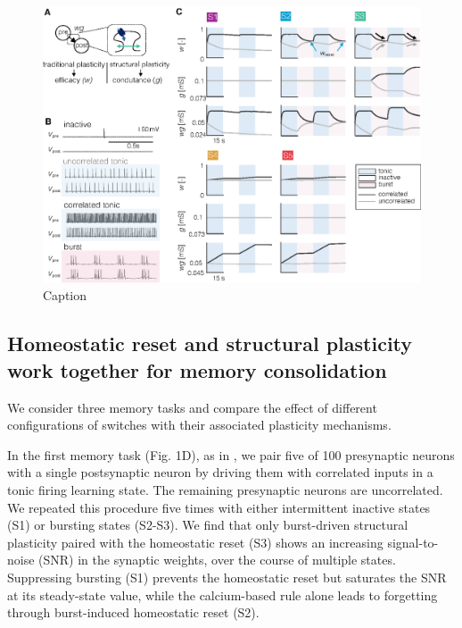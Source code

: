 \begin{figure}
    \centering
    \includegraphics{fig/Task/Fig1.eps}
    \caption{Caption}
    \label{fig:Task_1}
\end{figure}


\subsection{Homeostatic reset and structural plasticity work together for memory consolidation}
We consider three memory tasks and compare the effect of different configurations of switches with their associated plasticity mechanisms. 

In the first memory task (Fig. 1D), as in \citep{gonzalez-rueda_activity-dependent_2018}, we pair five of 100 presynaptic neurons with a single postsynaptic neuron by driving them with correlated inputs in a tonic firing learning state. The remaining presynaptic neurons are uncorrelated. We repeated this procedure five times with either intermittent inactive states (S1) or bursting states (S2-S3). We find that only burst-driven structural plasticity paired with the homeostatic reset (S3) shows an increasing signal-to-noise (SNR) in the synaptic weights, over the course of multiple states. Suppressing bursting (S1) prevents the homeostatic reset but saturates the SNR at its steady-state value, while the calcium-based rule alone leads to forgetting through burst-induced homeostatic reset (S2). 



